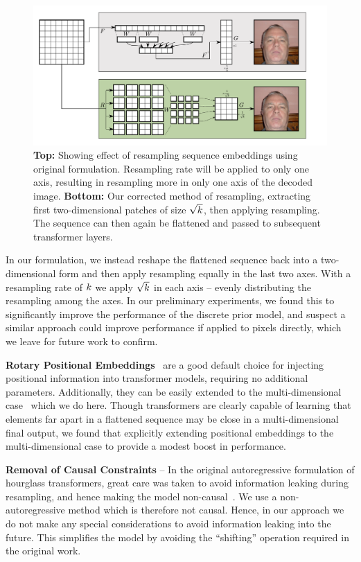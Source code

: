 \begin{figure}[ht!]
    \centering
    \includegraphics[width=\textwidth]{figures/resample.pdf}
    \caption{
        \textbf{Top:} Showing effect of resampling sequence embeddings using
        original formulation. Resampling rate will be applied to only one axis,
        resulting in resampling more in only one axis of the decoded image.
        \textbf{Bottom:} Our corrected method of resampling, extracting first
        two-dimensional patches of size $\sqrt{k}$, then applying
        resampling. The sequence can then again be flattened and passed to
        subsequent transformer layers.
    }
\end{figure}


In our formulation, we instead reshape the flattened sequence back into a
two-dimensional form and then apply resampling equally in the last two axes.
With a resampling rate of $k$ we apply $\sqrt{k}$ in
each axis -- evenly distributing the resampling among the axes. In our
preliminary experiments, we found this to significantly improve the performance
of the discrete prior model, and suspect a similar approach could improve
performance if applied to pixels directly, which we leave for future work to
confirm.

\textbf{Rotary Positional Embeddings}~\cite{su2021roformer} are a good default
choice for injecting positional information into transformer models, requiring
no additional parameters. Additionally, they can be easily extended to the
multi-dimensional case~\cite{rope-eleutherai} which we do here. Though
transformers are clearly capable of learning that elements far apart in a
flattened sequence may be close in a multi-dimensional final output, we found
that explicitly extending positional embeddings to the multi-dimensional case to
provide a modest boost in performance.

\textbf{Removal of Causal Constraints} -- In the original autoregressive
formulation of hourglass transformers, great care was taken to avoid information
leaking during resampling, and hence making the model
non-causal~\cite{nawrot2021hierarchical}. We use a non-autoregressive method
which is therefore not causal. Hence, in our approach we do not make any special
considerations to avoid information leaking into the future. This simplifies the
model by avoiding the ``shifting'' operation required in the original work.


